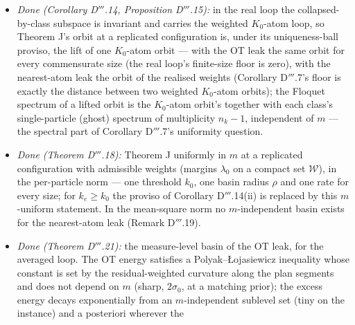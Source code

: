 \begin{enumerate}[label=\arabic*.,leftmargin=*]
\begin{itemize}
      (mean square) holds under the strict second-order optimality condition along the mean-field flow, with explicit
      constants carrying the transient's $e^{2\Lambda_1}$; the window
      $\kappa_R[\mu_\infty] < \sigma_0 < \sigma_{\mathrm{crit}}$ is where learning and uniformity coexist. The cold
      start of Theorem D$''$'s experiment was outside it on two counts (the expanding transient, and a connected
      support threading the ridges, where the coupling has a floor of pairs in different basins). At finite $m$ the
      stationary coupled distance is the weight-sensitivity law of Proposition D$'''$.5, and Corollary D$'''$.7
      carries the uniform statement to the real loop on a warm start through Theorem J.
    \item \emph{Done (Corollary D$'''$.14, Proposition D$'''$.15):} in the real loop the collapsed-by-class subspace
      is invariant and carries the weighted $K_0$-atom loop, so Theorem J's orbit at a replicated configuration is,
      under its uniqueness-ball proviso, the lift of one $K_0$-atom orbit --- with the OT leak the same orbit for
      every commensurate size (the real loop's finite-size floor is zero), with the nearest-atom leak the orbit of
      the realised weights (Corollary D$'''$.7's floor is exactly the distance between two weighted $K_0$-atom
      orbits); the Floquet spectrum of a lifted orbit is the $K_0$-atom orbit's together with each class's
      single-particle (ghost) spectrum of multiplicity $n_k - 1$, independent of $m$ --- the spectral part of
      Corollary D$'''$.7's uniformity question.
    \item \emph{Done (Theorem D$'''$.18):} Theorem J uniformly in $m$ at a replicated configuration with admissible
      weights (margins $\lambda_0$ on a compact set $\mathcal{W}$), in the per-particle norm --- one threshold $k_0$,
      one basin radius $\rho$ and one rate for every size; for $k_e\ge k_0$ the proviso of Corollary D$'''$.14(ii) is
      replaced by this $m$-uniform statement. In the mean-square norm no $m$-independent basin exists for the
      nearest-atom leak (Remark D$'''$.19).
    \item \emph{Done (Theorem D$'''$.21):} the measure-level basin of the OT leak, for the averaged loop. The OT
      energy satisfies a Polyak--{\L}ojasiewicz inequality whose constant is set by the residual-weighted curvature
      along the plan segments and does not depend on $m$ (sharp, $2\sigma_0$, at a matching prior); the excess energy
      decays exponentially from an $m$-independent sublevel set (tiny on the instance) and a posteriori wherever the

\end{itemize}
\end{enumerate}
